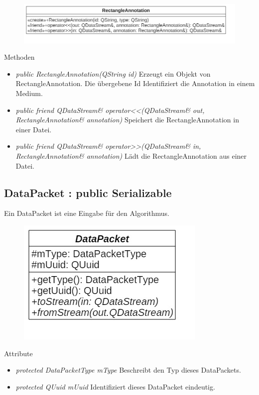\begin{figure}[H]
\centering
\includegraphics[scale=0.5]{img/Klassendiagramm/Klassen/Model/RectangleAnnotation}
\label{fig:rectangleAnnotation}
\end{figure}

Methoden
\begin{itemize}
\item \textit{public RectangleAnnotation(QString id)} Erzeugt ein Objekt von RectangleAnnotation. Die übergebene Id Identifiziert die Annotation in einem Medium.
\item \textit{public friend QDataStream\& operator<<(QDataStream\& out, RectangleAnnotation\& annotation)} Speichert die RectangleAnnotation in einer Datei.
\item \textit{public friend QDataStream\& operator>>(QDataStream\& in, RectangleAnnotation\& annotation)} Lädt die RectangleAnnotation aus einer Datei.
\end{itemize}

\subsection*{DataPacket : public Serializable}
Ein DataPacket ist eine Eingabe für den Algorithmus.

\begin{figure}[H]
\centering
\includegraphics[scale=0.5]{img/Klassendiagramm/Klassen/Model/DataPacket}
\label{fig:dataPacket}
\end{figure}

Attribute
\begin{itemize}
\item\textit{protected DataPacketType mType} Beschreibt den Typ dieses DataPackets.
\item\textit{protected QUuid mUuid} Identifiziert dieses DataPacket eindeutig. 
\end{itemize}

